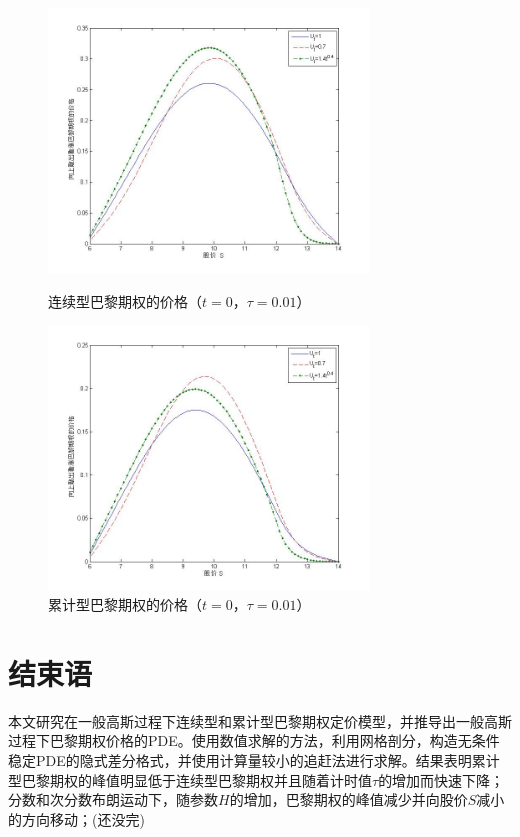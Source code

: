 \documentclass{ctexart} %
\begin{document}
\begin{figure}[H]
\begin{minipage}{0.48\linewidth}
\includegraphics[width=8.5cm]{code/t0.jpg}
\caption{连续型巴黎期权的价格（$t=0$，$\tau=0.01$）}
\end{minipage}
\begin{minipage}{0.48\linewidth}
\includegraphics[width=8.5cm]{code/tc0.jpg}
\caption{累计型巴黎期权的价格（$t=0$，$\tau=0.01$）}
\end{minipage}
\end{figure}

\section{结束语}
本文研究在一般高斯过程下连续型和累计型巴黎期权定价模型，并推导出一般高斯过程下巴黎期权价格的PDE。使用数值求解的方法，利用网格剖分，构造无条件稳定PDE的隐式差分格式，并使用计算量较小的追赶法进行求解。结果表明累计型巴黎期权的峰值明显低于连续型巴黎期权并且随着计时值$\tau$的增加而快速下降；分数和次分数布朗运动下，随参数$H$的增加，巴黎期权的峰值减少并向股价$S$减小的方向移动；(还没完) 
\end{document}
